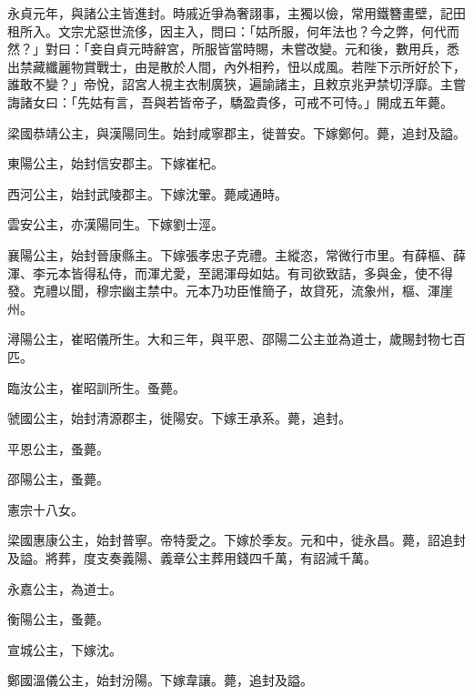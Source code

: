 \begin{pinyinscope}
 永貞元年，與諸公主皆進封。時戚近爭為奢詡事，主獨以儉，常用鐵簪畫壁，記田租所入。文宗尤惡世流侈，因主入，問曰：「姑所服，何年法也？今之弊，何代而然？」對曰：「妾自貞元時辭宮，所服皆當時賜，未嘗改變。元和後，數用兵，悉出禁藏纖麗物賞戰士，由是散於人間，內外相矜，忸以成風。若陛下示所好於下，誰敢不變？」帝悅，詔宮人視主衣制廣狹，遍諭諸主，且敕京兆尹禁切浮靡。主嘗誨諸女曰：「先姑有言，吾與若皆帝子，驕盈貴侈，可戒不可恃。」開成五年薨。



 梁國恭靖公主，與漢陽同生。始封咸寧郡主，徙普安。下嫁鄭何。薨，追封及謚。



 東陽公主，始封信安郡主。下嫁崔杞。



 西河公主，始封武陵郡主。下嫁沈翬。薨咸通時。



 雲安公主，亦漢陽同生。下嫁劉士涇。



 襄陽公主，始封晉康縣主。下嫁張孝忠子克禮。主縱恣，常微行市里。有薛樞、薛渾、李元本皆得私侍，而渾尤愛，至謁渾母如姑。有司欲致詰，多與金，使不得發。克禮以聞，穆宗幽主禁中。元本乃功臣惟簡子，故貸死，流象州，樞、渾崖州。



 潯陽公主，崔昭儀所生。大和三年，與平恩、邵陽二公主並為道士，歲賜封物七百匹。



 臨汝公主，崔昭訓所生。蚤薨。



 虢國公主，始封清源郡主，徙陽安。下嫁王承系。薨，追封。



 平恩公主，蚤薨。



 邵陽公主，蚤薨。



 憲宗十八女。



 梁國惠康公主，始封普寧。帝特愛之。下嫁於季友。元和中，徙永昌。薨，詔追封及謚。將葬，度支奏義陽、義章公主葬用錢四千萬，有詔減千萬。



 永嘉公主，為道士。



 衡陽公主，蚤薨。



 宣城公主，下嫁沈。



 鄭國溫儀公主，始封汾陽。下嫁韋讓。薨，追封及謚。




\end{pinyinscope}
